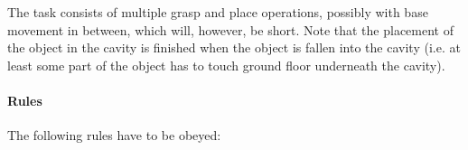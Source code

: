 The task consists of multiple grasp and place operations, possibly with base movement in between, which will, however, be short. Note that the placement of the object in the cavity is finished when the object is fallen into the cavity (i.e. at least some part of the object has to touch ground floor underneath the cavity).

%
%
%

\paragraph{Rules}
The following rules have to be obeyed:


%



